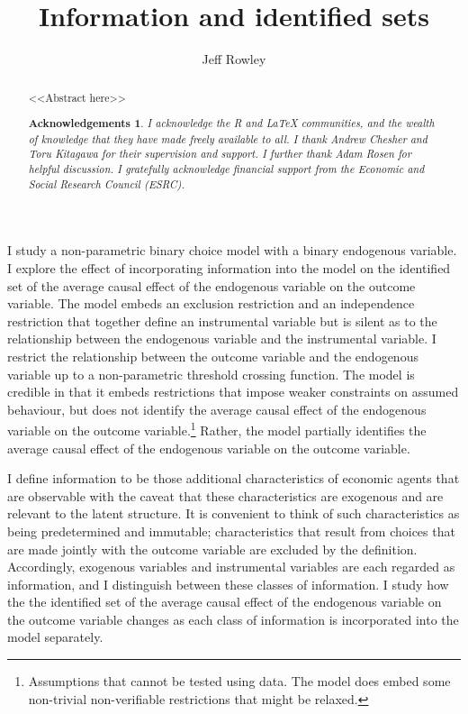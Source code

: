 \documentclass[12pt,a4paper,twoside]{article}
\title{Information and identified sets}
\author{Jeff Rowley}
\newtheorem*{Acknowledgements}{Acknowledgements}
\numberwithin{equation}{section}
\newcommand{\ESRC}{I gratefully acknowledge financial support from the Economic and Social Research Council (ESRC).}
\newcommand{\RLaTeX}{I acknowledge the \emph{R} and \emph{\LaTeX} communities, and the wealth of knowledge that they have made freely available to all.}
\begin{document}
\maketitle
\vspace{10mm}
\begin{abstract}
\noindent <<Abstract here>>
\begin{Acknowledgements}
{\RLaTeX} I thank Andrew Chesher and Toru Kitagawa for their supervision and support. I further thank Adam Rosen for helpful discussion. {\ESRC}
\end{Acknowledgements}
\end{abstract}
\vspace{5mm}
I study a non-parametric binary choice model with a binary endogenous variable. I explore the effect of incorporating information into the model on the identified set of the average causal effect of the endogenous variable on the outcome variable. The model embeds an exclusion restriction and an independence restriction that together define an instrumental variable but is silent as to the relationship between the endogenous variable and the instrumental variable. I restrict the relationship between the outcome variable and the endogenous variable up to a non-parametric threshold crossing function. The model is credible \citep{book.manski} in that it embeds restrictions that impose weaker constraints on assumed behaviour, but does not identify the average causal effect of the endogenous variable on the outcome variable.\footnote{Assumptions that cannot be tested using data. The model does embed some non-trivial non-verifiable restrictions that might be relaxed.} Rather, the model partially identifies the average causal effect of the endogenous variable on the outcome variable. 

I define information to be those additional characteristics of economic agents that are observable with the caveat that these characteristics are exogenous and are relevant to the latent structure. It is convenient to think of such characteristics as being predetermined and immutable; characteristics that result from choices that are made jointly with the outcome variable are excluded by the definition. Accordingly, exogenous variables and instrumental variables are each regarded as information, and I distinguish between these classes of information. I study how the the identified set of the average causal effect of the endogenous variable on the outcome variable changes as each class of information is incorporated into the model separately. 
\end{document}
